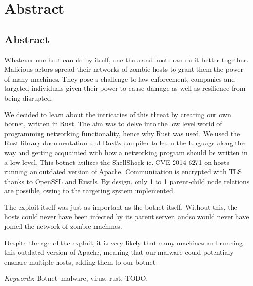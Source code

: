 \documentclass[../main.tex]{subfiles}
\begin{document}
    \newpage

	\chapter*{Abstract}

    \section*{Abstract}

Whatever one host can do by itself, one thousand hosts can do it better together. Malicious actors spread their networks of zombie hosts to grant them the power of many machines.
They pose a challenge to law enforcement, companies and targeted individuals given their power to cause damage as well as resilience from being disrupted.

We decided to learn about the intricacies of this threat by creating our own botnet, written in Rust.
The aim was to delve into the low level world of programming networking functionality, hence why Rust was used. We used the Rust library documentation and Rust's compiler to learn
the language along the way and getting acquainted with how a networking program should be written in a low level.
This botnet utilizes the ShellShock ie. CVE-2014-6271 on hosts running an outdated version of Apache.
Communication is encrypted with TLS thanks to OpenSSL and Rustls. By design, only 1 to 1 parent-child node relations are possible, owing to the targeting system implemented.

The exploit itself was just as important as the botnet itself. Without this, the hosts could never have been infected by its parent server, andso would never have joined the network
of zombie machines.

Despite the age of the exploit, it is very likely that many machines and running this outdated version of Apache, meaning that our malware could potentialy ensnare multiple hosts,
adding them to our botnet.


	\qquad \textit{Keywords}: Botnet, malware, virus, rust, TODO.


	\vspace{10pt}
\end{document}
